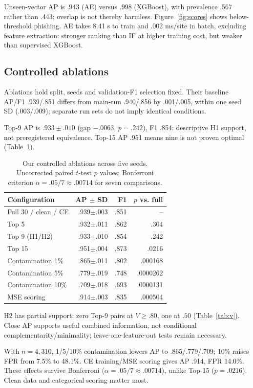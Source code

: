 \documentclass[11pt]{article}
\begin{document}
Unseen-vector AP is .943 (AE) versus .998 (XGBoost), with prevalence .567 rather than .443; overlap is not thereby harmless. Figure~\ref{fig:scores} shows below-threshold phishing. AE takes 8.41 s to train and .002 ms/site in batch, excluding feature extraction: stronger ranking than IF at higher training cost, but weaker than supervised XGBoost.

\subsection{Controlled ablations}\label{sec:ablation}
Ablations hold split, seeds and validation-F1 selection fixed. Their baseline AP/F1 .939/.851 differs from main-run .940/.856 by .001/.005, within one seed SD (.003/.009); separate run sets do not imply identical conditions.

Top-9 AP is $.933\pm.010$ (gap $-.0063$, $p=.242$), F1 .854: descriptive H1 support, not preregistered equivalence. Top-15 AP .951 means nine is not proven optimal (Table~\ref{tab:abl}).
\begin{table}[t]\centering\small
\begin{tabular}{lrrr}\toprule
Configuration & AP $\pm$ SD & F1 & $p$ vs. full\\\midrule
Full 30 / clean / CE & .939$\pm$.003 & .851 & --\\
Top 5 & .932$\pm$.011 & .862 & .304\\
Top 9 (H1/H2) & .933$\pm$.010 & .854 & .242\\
Top 15 & .951$\pm$.004 & .873 & .0216\\
Contamination 1\% & .865$\pm$.011 & .802 & .000168\\
Contamination 5\% & .779$\pm$.019 & .748 & .0000262\\
Contamination 10\% & .709$\pm$.018 & .693 & .0000131\\
MSE scoring & .914$\pm$.003 & .835 & .000504\\\bottomrule
\end{tabular}
\caption{Our controlled ablations across five seeds. Uncorrected paired $t$-test $p$ values; Bonferroni criterion $\alpha=.05/7\approx.00714$ for seven comparisons.}\label{tab:abl}
\end{table}
H2 has partial support: zero Top-9 pairs at $V\geq.80$, one at $.50$ (Table~\ref{tab:v}). Close AP supports useful combined information, not conditional complementarity/minimality; leave-one-feature-out tests remain necessary.

With $n=4,310$, 1/5/10\% contamination lowers AP to .865/.779/.709; 10\% raises FPR from 7.5\% to 48.1\%. CE training/MSE scoring gives AP .914, FPR 14.0\%. These effects survive Bonferroni ($\alpha=.05/7\approx.00714$), unlike Top-15 ($p=.0216$). Clean data and categorical scoring matter most.
\end{document}
